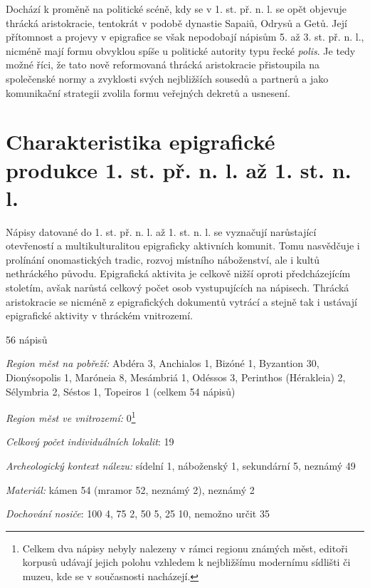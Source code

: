 Dochází k proměně na politické scéně, kdy se v 1. st. př. n. l. se opět objevuje thrácká aristokracie, tentokrát v podobě dynastie Sapaiů, Odrysů a Getů. Její přítomnost a projevy v epigrafice se však nepodobají nápisům 5. až 3. st. př. n. l., nicméně mají formu obvyklou spíše u politické autority typu řecké {\em polis}. Je tedy možné říci, že tato nově reformovaná thrácká aristokracie přistoupila na společenské normy a zvyklosti svých nejbližších sousedů a partnerů a jako komunikační strategii zvolila formu veřejných dekretů a usnesení.

\section[charakteristika-epigrafické-produkce-1.-st.-př.-n.-l.-až-1.-st.-n.-l.]{Charakteristika epigrafické produkce 1. st. př. n. l. až 1. st. n. l.}

Nápisy datované do 1. st. př. n. l. až 1. st. n. l. se vyznačují narůstající otevřeností a multikulturalitou epigraficky aktivních komunit. Tomu nasvědčuje i prolínání onomastických tradic, rozvoj místního náboženství, ale i kultů nethráckého původu. Epigrafická aktivita je celkově nižší oproti předcházejícím stoletím, avšak narůstá celkový počet osob vystupujících na nápisech. Thrácká aristokracie se nicméně z epigrafických dokumentů vytrácí a stejně tak i ustávají epigrafické aktivity v thráckém vnitrozemí.

\placetable[none]{}
\starttable[|l|]
\HL
{} 56 nápisů

{\em Region měst na pobřeží:} Abdéra 3, Anchialos 1, Bizóné 1, Byzantion 30, Dionýsopolis 1, Maróneia 8, Mesámbriá 1, Odéssos 3, Perinthos (Hérakleia) 2, Sélymbria 2, Séstos 1, Topeiros 1 (celkem 54 nápisů)

{\em Region měst ve vnitrozemí:} 0\footnote{Celkem dva nápisy nebyly nalezeny v rámci regionu známých měst, editoři korpusů udávají jejich polohu vzhledem k nejbližšímu modernímu sídlišti či muzeu, kde se v současnosti nacházejí.}

{\em Celkový počet individuálních lokalit}: 19

{\em Archeologický kontext nálezu:} sídelní 1, náboženský 1, sekundární 5, neznámý 49

{\em Materiál:} kámen 54 (mramor 52, neznámý 2), neznámý 2

{\em Dochování nosiče}: 100  4, 75  2, 50  5, 25  10, nemožno určit 35


